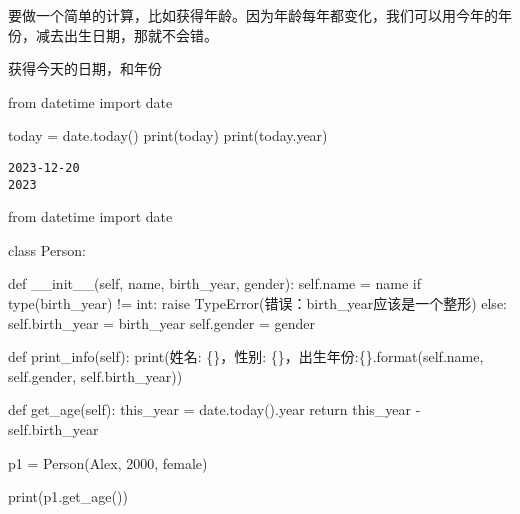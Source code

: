 \documentclass[
  letterpaper,
  DIV=11,
  numbers=noendperiod]{scrreprt}
\newenvironment{Shaded}{\begin{snugshade}}{\end{snugshade}}
\newcommand{\BuiltInTok}[1]{\textcolor[rgb]{0.00,0.23,0.31}{#1}}
\newcommand{\ControlFlowTok}[1]{\textcolor[rgb]{0.00,0.23,0.31}{#1}}
\newcommand{\DecValTok}[1]{\textcolor[rgb]{0.68,0.00,0.00}{#1}}
\newcommand{\FunctionTok}[1]{\textcolor[rgb]{0.28,0.35,0.67}{#1}}
\newcommand{\ImportTok}[1]{\textcolor[rgb]{0.00,0.46,0.62}{#1}}
\newcommand{\KeywordTok}[1]{\textcolor[rgb]{0.00,0.23,0.31}{#1}}
\newcommand{\NormalTok}[1]{\textcolor[rgb]{0.00,0.23,0.31}{#1}}
\newcommand{\OperatorTok}[1]{\textcolor[rgb]{0.37,0.37,0.37}{#1}}
\newcommand{\PreprocessorTok}[1]{\textcolor[rgb]{0.68,0.00,0.00}{#1}}
\newcommand{\SpecialCharTok}[1]{\textcolor[rgb]{0.37,0.37,0.37}{#1}}
\newcommand{\StringTok}[1]{\textcolor[rgb]{0.13,0.47,0.30}{#1}}
\newcommand{\VariableTok}[1]{\textcolor[rgb]{0.07,0.07,0.07}{#1}}
\begin{document}
要做一个简单的计算，比如获得年龄。因为年龄每年都变化，我们可以用今年的年份，减去出生日期，那就不会错。

获得今天的日期，和年份

\begin{Shaded}
\begin{Highlighting}[]
\ImportTok{from}\NormalTok{ datetime }\ImportTok{import}\NormalTok{ date}

\NormalTok{today }\OperatorTok{=}\NormalTok{ date.today()}
\BuiltInTok{print}\NormalTok{(today)}
\BuiltInTok{print}\NormalTok{(today.year)}
\end{Highlighting}
\end{Shaded}

\begin{verbatim}
2023-12-20
2023
\end{verbatim}

\begin{Shaded}
\begin{Highlighting}[]
\ImportTok{from}\NormalTok{ datetime }\ImportTok{import}\NormalTok{ date}

\KeywordTok{class}\NormalTok{ Person:}

    \KeywordTok{def} \FunctionTok{\_\_init\_\_}\NormalTok{(}\VariableTok{self}\NormalTok{, name, birth\_year, gender):}
        \VariableTok{self}\NormalTok{.name }\OperatorTok{=}\NormalTok{ name}
        \ControlFlowTok{if} \BuiltInTok{type}\NormalTok{(birth\_year) }\OperatorTok{!=} \BuiltInTok{int}\NormalTok{:}
            \ControlFlowTok{raise} \PreprocessorTok{TypeError}\NormalTok{(}\StringTok{\textquotesingle{}错误：birth\_year应该是一个整形\textquotesingle{}}\NormalTok{)}
        \ControlFlowTok{else}\NormalTok{:}
            \VariableTok{self}\NormalTok{.birth\_year }\OperatorTok{=}\NormalTok{ birth\_year}
        \VariableTok{self}\NormalTok{.gender }\OperatorTok{=}\NormalTok{ gender}

    \KeywordTok{def}\NormalTok{ print\_info(}\VariableTok{self}\NormalTok{):}
        \BuiltInTok{print}\NormalTok{(}\StringTok{\textquotesingle{}姓名: }\SpecialCharTok{\{\}}\StringTok{，性别: }\SpecialCharTok{\{\}}\StringTok{，出生年份:}\SpecialCharTok{\{\}}\StringTok{\textquotesingle{}}\NormalTok{.}\BuiltInTok{format}\NormalTok{(}\VariableTok{self}\NormalTok{.name, }\VariableTok{self}\NormalTok{.gender, }\VariableTok{self}\NormalTok{.birth\_year))}

    \KeywordTok{def}\NormalTok{ get\_age(}\VariableTok{self}\NormalTok{):}
\NormalTok{        this\_year }\OperatorTok{=}\NormalTok{ date.today().year}
        \ControlFlowTok{return}\NormalTok{ this\_year }\OperatorTok{{-}} \VariableTok{self}\NormalTok{.birth\_year}
    
\NormalTok{p1 }\OperatorTok{=}\NormalTok{ Person(}\StringTok{\textquotesingle{}Alex\textquotesingle{}}\NormalTok{, }\DecValTok{2000}\NormalTok{, }\StringTok{\textquotesingle{}female\textquotesingle{}}\NormalTok{)}

\BuiltInTok{print}\NormalTok{(p1.get\_age())}
\end{Highlighting}
\end{Shaded}
\end{document}
